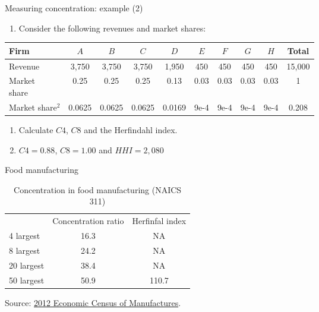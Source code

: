 \documentclass[table,xcolor=pdftex,dvipsnames]{beamer}\usepackage[]{graphicx}\usepackage[]{color}
\begin{document}

\begin{frame}{Measuring concentration: example (2)}
\begin{enumerate}[label=\textbullet]
  \item Consider the following revenues and market shares:
\end{enumerate}
\begin{table}
\scriptsize
\begin{tabular}{l c c c c c c c c c}
  \toprule
Firm & $A$ & $B$ & $C$ & $D$ & $E$ & $F$ & $G$ & $H$ & Total\\
    \midrule
Revenue & 3,750 & 3,750 & 3,750 & 1,950 & 450 & 450 & 450 & 450 & 15,000\\
\parbox[b][][b]{0.25in}{Market\\share} & 0.25 & 0.25 & 0.25 & 0.13 & 0.03 & 0.03 & 0.03 & 0.03 & 1\\
\parbox[b][][b]{0.25in}{Market\\share$^2$}  & 0.0625 & 0.0625 & 0.0625 & 0.0169 & 9e-4 & 9e-4 & 9e-4 & 9e-4 & 0.208 \\
  \bottomrule
\end{tabular}
\end{table}
\begin{enumerate}[label=\textbullet]
  \item Calculate $C4$, $C8$ and the Herfindahl index.
  \pause
  \item $C4=0.88$, $C8=1.00$ and $HHI=2,080$
\end{enumerate}
\end{frame}


\begin{frame}{Food manufacturing}
\begin{center}
\begin{table}
    \caption{Concentration in food manufacturing (NAICS 311)}
    \begin{tabular}{ l  c  c }%
      \toprule
       & Concentration ratio & Herfinfal index \\
      \cmidrule(r){2-3}
      4 largest & 16.3 & NA \\
      8 largest & 24.2 & NA \\
      20 largest & 38.4 & NA \\
      50 largest & 50.9 & 110.7 \\
      \bottomrule
    \end{tabular}
\end{table}
\end{center}
Source: \href{http://factfinder.census.gov/faces/tableservices/jsf/pages/productview.xhtml?pid=ECN_2012_US_31SR2&prodType=table}{2012 Economic Census of Manufactures}.
\end{frame}
\end{document}
